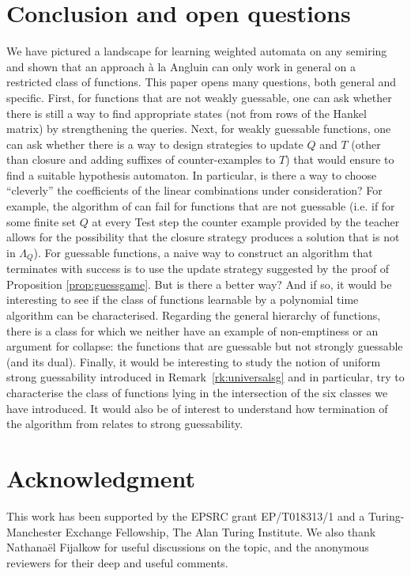 \documentclass{lmcs}
\numberwithin{theorem}{section}
\begin{document}
\section{Conclusion and open questions}
\label{section:conclusion}
We have pictured a landscape for learning weighted automata on any semiring and shown that an approach \`a la Angluin can only work in general on a restricted class of functions. This paper opens many questions, both general and specific. First, for functions that are not weakly guessable, one can ask whether there is still a way to find appropriate states (not from rows of the Hankel matrix) by strengthening the queries. Next, for weakly guessable functions, one can ask whether there is a way to design strategies to update $Q$ and $T$ (other than closure and adding suffixes of counter-examples to $T$) that would ensure to find a suitable hypothesis automaton. In particular, is there a way to choose ``cleverly'' the coefficients of the linear combinations under consideration? For example, the algorithm of \cite{HKRS20} can fail for functions that are not guessable (i.e. if for some finite set $Q$ at every Test step the counter example provided by the teacher allows for the possibility that the closure strategy  produces a solution that is not in $\Lambda_Q$). For guessable functions, a naive way to construct an algorithm that terminates with success is to use the update strategy suggested by the proof of Proposition \ref{prop:guessgame}. But is there a better way? And if so, it would be interesting to see if the class of functions learnable by a polynomial time algorithm can be characterised. Regarding the general hierarchy of functions, there is a class for which we neither have an example of non-emptiness or an argument for collapse: the functions that are guessable but not strongly guessable (and its dual). Finally, it would be interesting to study the notion of uniform strong guessability introduced in Remark~\ref{rk:universalsg} and in particular, try to characterise the class of functions lying in the intersection of the six classes we have introduced. It would also be of interest to understand how termination of the algorithm from \cite{HKRS20} relates to strong guessability.  

\section*{Acknowledgment}
This work has been supported by the EPSRC grant EP/T018313/1 and a Turing-Manchester Exchange Fellowship, The Alan Turing Institute. We also thank Nathana\"el Fijalkow for useful discussions on the topic, and the anonymous reviewers for their deep and useful comments.
\end{document}
